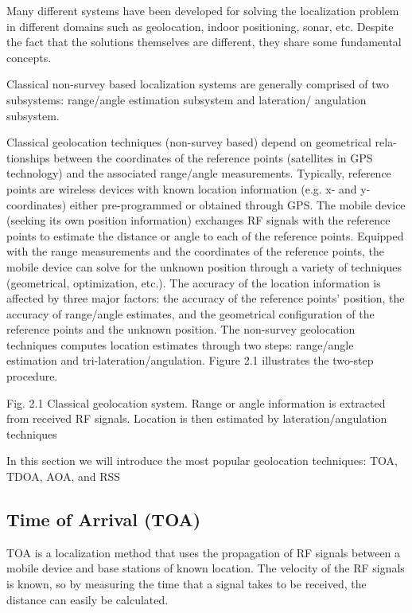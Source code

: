 Many different systems have been developed for solving the localization problem in different domains such as geolocation, indoor positioning, sonar, etc. Despite the fact that the  solutions themselves are different, they share some fundamental concepts.

Classical non-survey based localization systems \cite{GeoLoc} are generally comprised of two subsystems: range/angle
estimation subsystem and lateration/
angulation subsystem.

Classical geolocation techniques (non-survey based) depend on geometrical rela-
tionships between the coordinates of the reference points (satellites in GPS technology) and the associated range/angle measurements. Typically, reference points are wireless devices with known location information (e.g. x- and y-coordinates) either pre-programmed or obtained through GPS. The mobile device (seeking its own position information) exchanges RF signals with the reference points to estimate the distance or angle to each of the reference points. Equipped with the range measurements and the coordinates of the reference points, the mobile device can solve for the unknown position through a variety of techniques (geometrical, optimization, etc.). The accuracy of the location information is affected by three major factors: the accuracy of the reference points’ position, the accuracy of range/angle estimates, and the geometrical configuration of the reference points and the unknown position. The non-survey geolocation techniques computes location estimates through two steps: range/angle estimation and tri-lateration/angulation. Figure 2.1 illustrates the two-step procedure.

Fig. 2.1 Classical geolocation system. Range or angle information is extracted from received RF
signals. Location is then estimated by lateration/angulation techniques

In this section we will introduce the most popular geolocation techniques: TOA,
TDOA, AOA, and RSS



\subsection{Time of Arrival (TOA)}

TOA is a localization method that uses the propagation of RF signals between a mobile device and base stations of known location. The velocity of the RF signals is known, so by measuring the time that a signal takes to be received, the distance can easily be calculated. 

